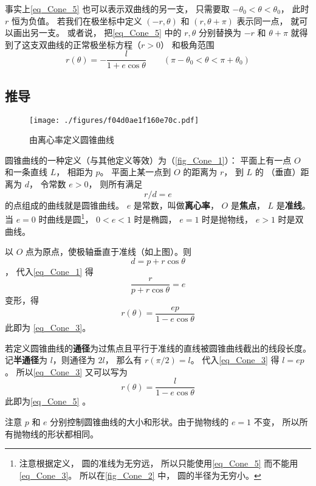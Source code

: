事实上\autoref{eq_Cone_5} 也可以表示双曲线的另一支， 只需要取 $-\theta_0< \theta < \theta_0$， 此时 $r$ 恒为负值。 若我们在极坐标中定义 $(-r, \theta)$ 和 $(r, \theta + \pi)$ 表示同一点， 就可以画出另一支。 或者说， 把\autoref{eq_Cone_5} 中的  $r,\theta$ 分别替换为 $-r$ 和 $\theta+\pi$ 就得到了这支双曲线的正常极坐标方程（$r > 0$） 和极角范围
\begin{equation}\label{eq_Cone_6}
r(\theta) = -\frac{l}{1 + e\cos\theta} \qquad (\pi - \theta_0<\theta < \pi + \theta_0)
\end{equation}

\subsection{推导}

\begin{figure}[ht]
\centering
\texttt{[image: ./figures/f04d0ae1f160e70c.pdf]}
\caption{由离心率定义圆锥曲线}\label{fig_Cone_1}
\end{figure}

圆锥曲线的一种定义（与其他定义等效）为（\autoref{fig_Cone_1}）：
平面上有一点 $O$ 和一条直线 $L$， 相距为 $p$。 
平面上某一点到 $O$ 的距离为 $r$， 到 $L$ 的
（垂直）距离为 $d$， 令常数 $e > 0$， 则所有满足
\begin{equation}\label{eq_Cone_1}
r/d = e
\end{equation}
的点组成的曲线就是圆锥曲线。 $e$ 是常数，叫做\textbf{离心率}， $O$ 是\textbf{焦点}， $L$ 是\textbf{准线}。 当 $e = 0$ 时曲线是圆\footnote{注意根据定义， 圆的准线为无穷远， 所以只能使用\autoref{eq_Cone_5} 而不能用\autoref{eq_Cone_3}。 所以在\autoref{fig_Cone_2} 中， 圆的半径为无穷小。}， $0 < e < 1$ 时是椭圆， $e = 1$ 时是抛物线， $e > 1$ 时是双曲线。

以 $O$ 点为原点，使极轴垂直于准线（如上图）。则 $$d = p + r \cos \theta $$， 代入\autoref{eq_Cone_1} 得
\begin{equation}\label{eq_Cone_2}
\frac{r}{p + r \cos \theta } = e
\end{equation}
变形，得
\begin{equation}
r(\theta) = \frac{ep}{1 - e\cos \theta }
\end{equation}
此即为 \autoref{eq_Cone_3}。

若定义圆锥曲线的\textbf{通径}为过焦点且平行于准线的直线被圆锥曲线截出的线段长度。 记\textbf{半通径}为 $l$，则通径为 $2l$， 那么有 $r(\pi /2) = l$。 代入\autoref{eq_Cone_3} 得 $l = ep$。 所以\autoref{eq_Cone_3} 又可以写为
\begin{equation}\label{eq_Cone_4}
r(\theta)  = \frac{l}{1 - e\cos \theta }
\end{equation}
此即为\autoref{eq_Cone_5} 。

注意 $p$ 和 $e$ 分别控制圆锥曲线的大小和形状。由于抛物线的 $e = 1$ 不变， 所以所有抛物线的形状都相同。
